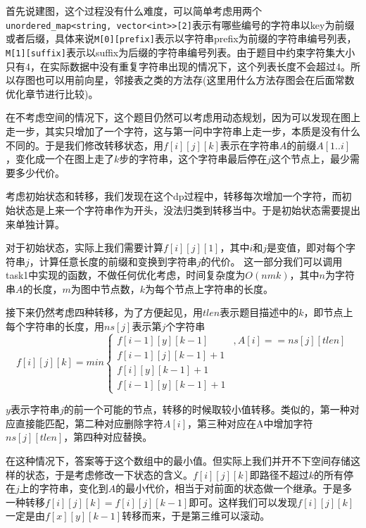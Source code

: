 \documentclass[a4paper, 11pt, nofonts, nocap, fancyhdr]{ctexart}
\begin{document}
首先说建图，这个过程没有什么难度，可以简单考虑用两个\texttt{unordered\_map<string, vector<int>>[2]}表示有哪些编号的字符串以key为前缀或者后缀，具体来说\texttt{M[0][prefix]}表示以字符串prefix为前缀的字符串编号列表，\texttt{M[1][suffix]}表示以suffix为后缀的字符串编号列表。由于题目中约束字符集大小只有4，在实际数据中没有重复字符串出现的情况下，这个列表长度不会超过4。所以存图也可以用前向星，邻接表之类的方法存(这里用什么方法存图会在后面常数优化章节进行比较)。

在不考虑空间的情况下，这个题目仍然可以考虑用动态规划，因为可以发现在图上走一步，其实只增加了一个字符，这与第一问中字符串上走一步，本质是没有什么不同的。于是我们修改转移状态，用$f[i][j][k]$表示在字符串$A$的前缀$A[1..i]$，变化成一个在图上走了$k$步的字符串，这个字符串最后停在$j$这个节点上，最少需要多少代价。

考虑初始状态和转移，我们发现在这个dp过程中，转移每次增加一个字符，而初始状态是上来一个字符串作为开头，没法归类到转移当中。于是初始状态需要提出来单独计算。

对于初始状态，实际上我们需要计算$f[i][j][1]$，其中$i$和$j$是变值，即对每个字符串$j$，计算任意长度的前缀和变换到字符串$j$的代价。
这一部分我们可以调用task1中实现的函数，不做任何优化考虑，时间复杂度为$O(nmk)$，其中$n$为字符串$A$的长度，$m$为图中节点数，$k$为每个节点上字符串的长度。

接下来仍然考虑四种转移，为了方便起见，用$tlen$表示题目描述中的$k$，即节点上每个字符串的长度，用$ns[j]$表示第$j$个字符串
\begin{equation*}
f[i][j][k] = min\left\{\begin{matrix}
f[i-1][y][k-1] & ,A[i] == ns[j][tlen] \\ 
f[i-1][j][k-1] + 1 & \\ 
f[i][y][k-1] + 1 & \\ 
f[i-1][y][k-1] + 1 & 
\end{matrix}\right.
\end{equation*}

$y$表示字符串$j$的前一个可能的节点，转移的时候取较小值转移。类似的，第一种对应直接能匹配，第二种对应删除字符$A[i]$，第三种对应在A中增加字符$ns[j][tlen]$，第四种对应替换。

在这种情况下，答案等于这个数组中的最小值。但实际上我们并开不下空间存储这样的状态，于是考虑修改一下状态的含义。$f[i][j][k]$即路径不超过$k$的所有停在$j$上的字符串，变化到$A$的最小代价，相当于对前面的状态做一个继承。于是多一种转移$f[i][j][k] = f[i][j][k-1]$即可。这样我们可以发现$f[i][j][k]$一定是由$f[x][y][k-1]$转移而来，于是第三维可以滚动。
\end{document}
